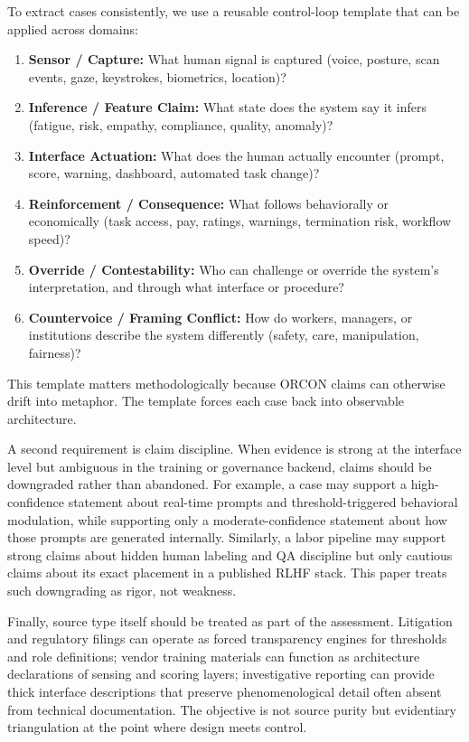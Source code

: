 \documentclass[runningheads]{llncs}
\begin{document}
To extract cases consistently, we use a reusable control-loop template that can be applied across domains:
\begin{enumerate}
\item \textbf{Sensor / Capture:} What human signal is captured (voice, posture, scan events, gaze, keystrokes, biometrics, location)?
\item \textbf{Inference / Feature Claim:} What state does the system say it infers (fatigue, risk, empathy, compliance, quality, anomaly)?
\item \textbf{Interface Actuation:} What does the human actually encounter (prompt, score, warning, dashboard, automated task change)?
\item \textbf{Reinforcement / Consequence:} What follows behaviorally or economically (task access, pay, ratings, warnings, termination risk, workflow speed)?
\item \textbf{Override / Contestability:} Who can challenge or override the system's interpretation, and through what interface or procedure?
\item \textbf{Countervoice / Framing Conflict:} How do workers, managers, or institutions describe the system differently (safety, care, manipulation, fairness)?
\end{enumerate}

This template matters methodologically because ORCON claims can otherwise drift into metaphor. The template forces each case back into observable architecture.

A second requirement is claim discipline. When evidence is strong at the interface level but ambiguous in the training or governance backend, claims should be downgraded rather than abandoned. For example, a case may support a high-confidence statement about real-time prompts and threshold-triggered behavioral modulation, while supporting only a moderate-confidence statement about how those prompts are generated internally. Similarly, a labor pipeline may support strong claims about hidden human labeling and QA discipline but only cautious claims about its exact placement in a published RLHF stack. This paper treats such downgrading as rigor, not weakness.

Finally, source type itself should be treated as part of the assessment. Litigation and regulatory filings can operate as forced transparency engines for thresholds and role definitions; vendor training materials can function as architecture declarations of sensing and scoring layers; investigative reporting can provide thick interface descriptions that preserve phenomenological detail often absent from technical documentation. The objective is not source purity but evidentiary triangulation at the point where design meets control.
\end{document}
